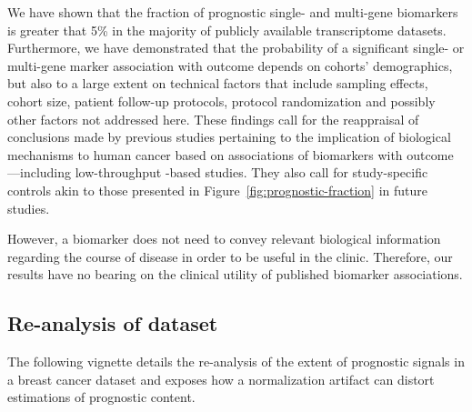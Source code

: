 We have shown that the fraction of prognostic single- and multi-gene biomarkers
is greater that 5\% in the majority of publicly available transcriptome
datasets.  Furthermore, we have demonstrated that the probability of a
significant single- or multi-gene marker association with outcome depends on
cohorts’ demographics, but also to a large extent on technical factors that
include sampling effects, cohort size, patient follow-up protocols, protocol
randomization and possibly other factors not addressed here.  These findings
call for the reappraisal of conclusions made by previous studies pertaining to
the implication of biological mechanisms to human cancer based on associations
of biomarkers with outcome---including low-throughput -based
studies.  They also call for study-specific controls akin to those presented in
Figure~\ref{fig:prognostic-fraction} in future studies.

However, a biomarker does not need to convey relevant biological information
regarding the course of disease in order to be useful in the clinic.  Therefore,
our results have no bearing on the clinical utility of published biomarker
associations.

\subsection{Re-analysis of dataset }
\label{sec:reanalysis-gse9893}
The following vignette details the re-analysis of the extent of prognostic
signals in a breast cancer dataset and exposes how a normalization artifact
can distort estimations of prognostic content.

% 




